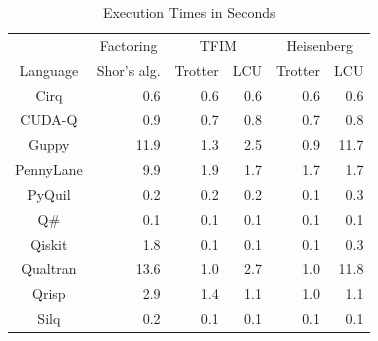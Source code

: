 \begin{table}[t]
  \centering
  \caption{Execution Times in Seconds}
  \begin{tabular}{c|r|rr|rr}
    \toprule
             & \multicolumn{1}{c|}{Factoring}
             & \multicolumn{2}{c|}{TFIM} & \multicolumn{2}{c}{Heisenberg} \\
    Language & Shor's alg. & Trotter & LCU & Trotter & LCU \\
    \midrule
    Cirq             &      0.6 &      0.6 &      0.6 &      0.6 &      0.6 \\
    CUDA-Q           &      0.9 &      0.7 &      0.8 &      0.7 &      0.8 \\
    Guppy            &     11.9 &      1.3 &      2.5 &      0.9 &     11.7 \\
    PennyLane        &      9.9 &      1.9 &      1.7 &      1.7 &      1.7 \\
    PyQuil           &      0.2 &      0.2 &      0.2 &      0.1 &      0.3 \\
    Q\#              &      0.1 &      0.1 &      0.1 &      0.1 &      0.1 \\
    Qiskit           &      1.8 &      0.1 &      0.1 &      0.1 &      0.3 \\
    Qualtran         &     13.6 &      1.0 &      2.7 &      1.0 &     11.8 \\
    \hline
    Qrisp            &      2.9 &      1.4 &      1.1 &      1.0 &      1.1 \\
    Silq             &      0.2 &      0.1 &      0.1 &      0.1 &      0.1 \\
    \bottomrule
  \end{tabular}
  \label{tab:experimental-results}
\end{table}
%
